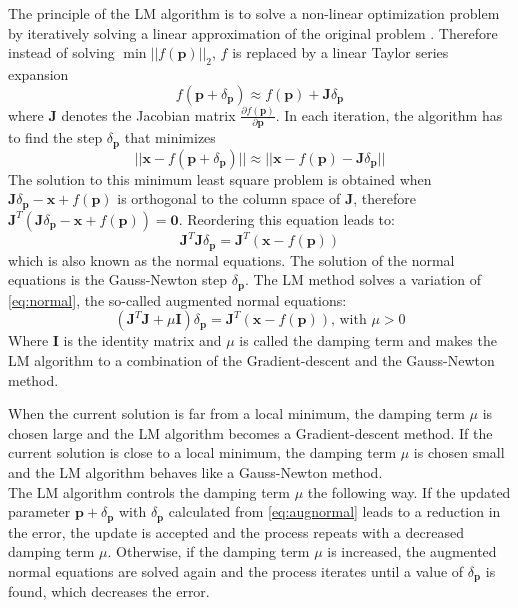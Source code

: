 The principle of the \ac{LM} algorithm is to solve a non-linear optimization problem by iteratively solving a linear approximation of the original problem \cite{Dahmen:937425}. Therefore instead of solving $\min ||f(\mathbf{p})||_2$, $f$ is replaced by a linear Taylor series expansion
\begin{equation} 
  f(\mathbf{p} + \delta_{\mathbf{p}}) \approx f(\mathbf{p}) + \mathbf{J} \delta_{\mathbf{p}}
\end{equation}
where $\mathbf{J}$ denotes the Jacobian matrix $\frac{\partial f(\mathbf{p})}{\partial \mathbf{p}}$. In each iteration, the algorithm has to find the step $\delta_{\mathbf{p}}$ that minimizes
\begin{equation} 
  || \mathbf{x} - f(\mathbf{p} + \delta_{\mathbf{p}})|| \approx ||\mathbf{x} - f(\mathbf{p}) - \mathbf{J} \delta_{\mathbf{p}}||
\end{equation}
The solution to this minimum least square problem is obtained when $\mathbf{J}\delta_{\mathbf{p}} - \mathbf{x} + f(\mathbf{p})$ is orthogonal to the column space of $\mathbf{J}$, therefore $\mathbf{J}^T(\mathbf{J} \delta_{\mathbf{p}} - \mathbf{x} + f(\mathbf{p})) = \mathbf{0}$. Reordering this equation leads to: 
\begin{equation} 
  \mathbf{J}^T\mathbf{J}\delta_{\mathbf{p}} = \mathbf{J}^T(\mathbf{x} - f(\mathbf{p}))
  \label{eq:normal}
\end{equation}
which is also known as the normal equations. The solution of the normal equations is the Gauss-Newton step $\delta_{\mathbf{p}}$.
The \ac{LM} method solves a variation of \autoref{eq:normal}, the so-called augmented normal equations:
\begin{equation} 
  (\mathbf{J}^T\mathbf{J} + \mu \mathbf{I})\delta_{\mathbf{p}} = \mathbf{J}^T(\mathbf{x} -f(\mathbf{p})) \text{, with } \mu > 0
  \label{eq:augnormal}
\end{equation}
Where $\mathbf{I}$ is the identity matrix and $\mu$ is called the damping term and makes the \ac{LM} algorithm to a combination of the Gradient-descent and the Gauss-Newton method.

When the current solution is far from a local minimum, the damping term $\mu$ is chosen large and the \ac{LM} algorithm becomes a Gradient-descent method. If the current solution is close to a local minimum, the damping term $\mu$ is chosen small and the \ac{LM} algorithm behaves like a Gauss-Newton method.\\

The \ac{LM} algorithm controls the damping term $\mu$ the following way. If the updated parameter $\mathbf{p} + \delta_{\mathbf{p}}$ with $\delta_{\mathbf{p}}$ calculated from \autoref{eq:augnormal} leads to a reduction in the error, the update is accepted and the process repeats with a decreased damping term $\mu$. Otherwise, if the damping term $\mu$ is increased, the augmented normal equations are solved again and the process iterates until a value of $\delta_{\mathbf{p}}$ is found, which decreases the error.\\

